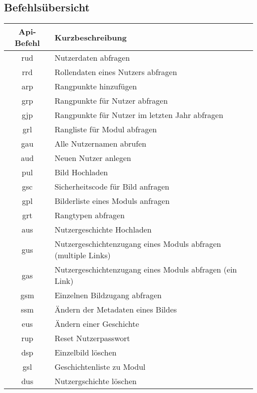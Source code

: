 \subsection{Befehlsübersicht}
\begin{longtable}[H]{|c|p{12cm}|}
		\hline
		\textbf{Api-Befehl} & \textbf{Kurzbeschreibung}              \\ \hline
		rud                 & Nutzerdaten abfragen          \\ \hline
		rrd                 & Rollendaten eines Nutzers abfragen            \\ \hline
		arp                 & Rangpunkte hinzufügen \\ \hline
		grp                 & Rangpunkte für Nutzer abfragen \\ \hline
		gjp                 & Rangpunkte für Nutzer im letzten Jahr abfragen \\ \hline
		grl                 & Rangliste für Modul abfragen \\ \hline
		gau                 & Alle Nutzernamen abrufen \\ \hline
		aud                 & Neuen Nutzer anlegen \\ \hline
		pul                 & Bild Hochladen \\ \hline
		gsc                 & Sicherheitscode für Bild anfragen \\ \hline
		gpl                 & Bilderliste eines Moduls anfragen \\ \hline
		grt                 & Rangtypen abfragen \\ \hline
		aus                 & Nutzergeschichte Hochladen \\ \hline
		gus                 & Nutzergeschichtenzugang eines Moduls abfragen (multiple Links)\\ \hline
		gas                 & Nutzergeschichtenzugang eines Moduls abfragen (ein Link)\\ \hline
		gsm                 & Einzelnen Bildzugang abfragen\\ \hline
		ssm                 & Ändern der Metadaten eines Bildes \\ \hline
		eus                 & Ändern einer Geschichte \\ \hline
		rup                 & Reset Nutzerpasswort \\ \hline
		dsp                 & Einzelbild löschen \\ \hline
		gsl                 & Geschichtenliste zu Modul \\ \hline
		dus                 & Nutzergschichte löschen \\ \hline

\end{longtable}
